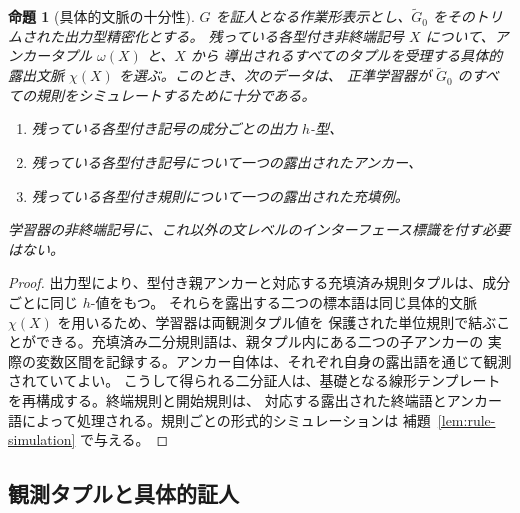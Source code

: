 \documentclass[11pt,a4paper]{ltjsarticle}
\newtheorem{proposition}[theorem]{命題}
\theoremstyle{remark}
\begin{document}
\begin{proposition}[具体的文脈の十分性]
\label{prop:concrete-context-sufficiency}
\(G\) を証人となる作業形表示とし、\(\widetilde G_0\) をそのトリムされた出力型精密化とする。
残っている各型付き非終端記号 \(X\) について、アンカータプル \(\omega(X)\) と、\(X\) から
導出されるすべてのタプルを受理する具体的露出文脈 \(\chi(X)\) を選ぶ。このとき、次のデータは、
正準学習器が \(\widetilde G_0\) のすべての規則をシミュレートするために十分である。
\begin{enumerate}[label=(\roman*),leftmargin=*]
\item 残っている各型付き記号の成分ごとの出力 \(h\)-型、
\item 残っている各型付き記号について一つの露出されたアンカー、
\item 残っている各型付き規則について一つの露出された充填例。
\end{enumerate}
学習器の非終端記号に、これ以外の文レベルのインターフェース標識を付す必要はない。
\end{proposition}

\begin{proof}
出力型により、型付き親アンカーと対応する充填済み規則タプルは、成分ごとに同じ \(h\)-値をもつ。
それらを露出する二つの標本語は同じ具体的文脈 \(\chi(X)\) を用いるため、学習器は両観測タプル値を
保護された単位規則で結ぶことができる。充填済み二分規則語は、親タプル内にある二つの子アンカーの
実際の変数区間を記録する。アンカー自体は、それぞれ自身の露出語を通じて観測されていてよい。
こうして得られる二分証人は、基礎となる線形テンプレートを再構成する。終端規則と開始規則は、
対応する露出された終端語とアンカー語によって処理される。規則ごとの形式的シミュレーションは
補題~\ref{lem:rule-simulation} で与える。
\end{proof}

\subsection{観測タプルと具体的証人}
\end{document}
